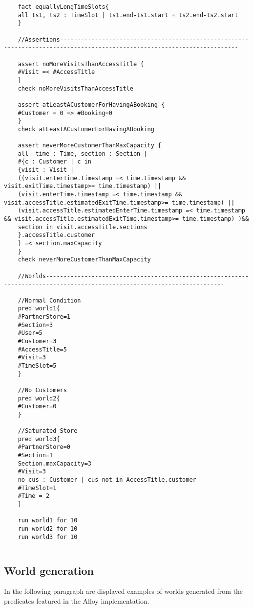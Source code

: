 \begin{lstlisting}
    fact equallyLongTimeSlots{
    all ts1, ts2 : TimeSlot | ts1.end-ts1.start = ts2.end-ts2.start
    }

    //Assertions-------------------------------------------------------------------------------------------------------------------------

    assert noMoreVisitsThanAccessTitle {
    #Visit =< #AccessTitle
    }
    check noMoreVisitsThanAccessTitle

    assert atLeastACustomerForHavingABooking {
    #Customer = 0 => #Booking=0
    }
    check atLeastACustomerForHavingABooking

    assert neverMoreCustomerThanMaxCapacity {
    all  time : Time, section : Section |
    #{c : Customer | c in
    {visit : Visit |
    ((visit.enterTime.timestamp =< time.timestamp && visit.exitTime.timestamp>= time.timestamp) ||
    (visit.enterTime.timestamp =< time.timestamp && visit.accessTitle.estimatedExitTime.timestamp>= time.timestamp) ||
    (visit.accessTitle.estimatedEnterTime.timestamp =< time.timestamp && visit.accessTitle.estimatedExitTime.timestamp>= time.timestamp) )&&
    section in visit.accessTitle.sections
    }.accessTitle.customer
    } =< section.maxCapacity
    }
    check neverMoreCustomerThanMaxCapacity

    //Worlds-------------------------------------------------------------------------------------------------------------------------

    //Normal Condition
    pred world1{
    #PartnerStore=1
    #Section=3
    #User=5
    #Customer=3
    #AccessTitle=5
    #Visit=3
    #TimeSlot=5
    }

    //No Customers
    pred world2{
    #Customer=0
    }

    //Saturated Store
    pred world3{
    #PartnerStore=0
    #Section=1
    Section.maxCapacity=3
    #Visit=3
    no cus : Customer | cus not in AccessTitle.customer
    #TimeSlot=1
    #Time = 2
    }

    run world1 for 10
    run world2 for 10
    run world3 for 10


\end{lstlisting}

\subsection{World generation}

In the following paragraph are displayed examples of worlds generated
from the predicates featured in the Alloy implementation.

